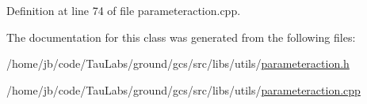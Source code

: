 \-Definition at line 74 of file parameteraction.\-cpp.



\-The documentation for this class was generated from the following files\-:\begin{DoxyCompactItemize}
\item 
/home/jb/code/\-Tau\-Labs/ground/gcs/src/libs/utils/\hyperlink{parameteraction_8h}{parameteraction.\-h}\item 
/home/jb/code/\-Tau\-Labs/ground/gcs/src/libs/utils/\hyperlink{parameteraction_8cpp}{parameteraction.\-cpp}\end{DoxyCompactItemize}
